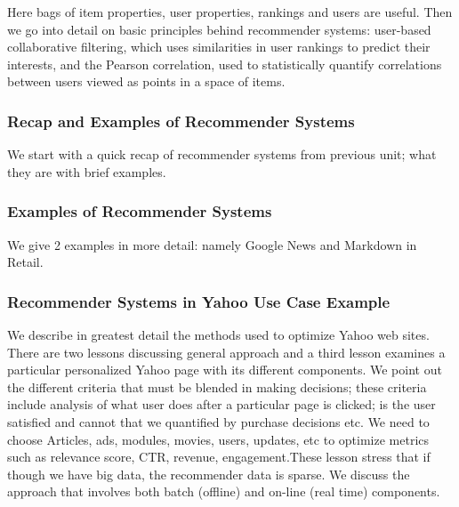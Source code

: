 Here bags of item properties, user properties, rankings and users are
useful. Then we go into detail on basic principles behind recommender
systems: user-based collaborative filtering, which uses similarities in
user rankings to predict their interests, and the Pearson correlation,
used to statistically quantify correlations between users viewed as
points in a space of items.



\subsubsection{Recap and Examples of Recommender
Systems}\label{recap-and-examples-of-recommender-systems}

We start with a quick recap of recommender systems from previous unit;
what they are with brief examples.



\subsubsection{Examples of Recommender
Systems}\label{examples-of-recommender-systems-1}

We give 2 examples in more detail: namely Google News and Markdown in
Retail.



\subsubsection{Recommender Systems in Yahoo Use Case
Example}\label{recommender-systems-in-yahoo-use-case-example}

We describe in greatest detail the methods used to optimize Yahoo web
sites. There are two lessons discussing general approach and a third
lesson examines a particular personalized Yahoo page with its different
components. We point out the different criteria that must be blended in
making decisions; these criteria include analysis of what user does
after a particular page is clicked; is the user satisfied and cannot
that we quantified by purchase decisions etc. We need to choose
Articles, ads, modules, movies, users, updates, etc to optimize metrics
such as relevance score, CTR, revenue, engagement.These lesson stress
that if though we have big data, the recommender data is sparse. We
discuss the approach that involves both batch (offline) and on-line
(real time) components.

